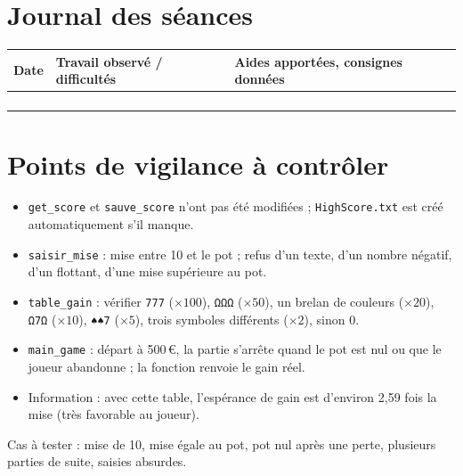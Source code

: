 \documentclass[10pt,a4paper]{article}
\begin{document}
\section*{Journal des séances}
\begin{tabularx}{\linewidth}{@{}C{2cm} X X@{}}
\toprule
{} Date & Travail observé / difficultés & Aides apportées, consignes données \\
\midrule
 & & \\[8mm]
\midrule
 & & \\[8mm]
\midrule
 & & \\[8mm]
\midrule
 & & \\[8mm]
\bottomrule
\end{tabularx}

\section*{Points de vigilance à contrôler}
\begin{itemize}
\item \texttt{get\_\allowbreak{}score} et \texttt{sauve\_\allowbreak{}score} n'ont pas été modifiées ; \texttt{HighScore.txt} est créé automatiquement s'il manque.
\item \texttt{saisir\_\allowbreak{}mise} : mise entre 10 et le pot ; refus d'un texte, d'un nombre négatif, d'un flottant, d'une mise supérieure au pot.
\item \texttt{table\_\allowbreak{}gain} : vérifier \texttt{777} ($\times 100$), \texttt{ΩΩΩ} ($\times 50$), un brelan de couleurs ($\times 20$), \texttt{Ω7Ω} ($\times 10$), \texttt{♠♠7} ($\times 5$), trois symboles différents ($\times 2$), sinon 0.
\item \texttt{main\_\allowbreak{}game} : départ à 500\,\euro, la partie s'arrête quand le pot est nul ou que le joueur abandonne ; la fonction renvoie le gain réel.
\item Information : avec cette table, l'espérance de gain est d'environ 2,59 fois la mise (très favorable au joueur).
\end{itemize}
\smallskip
Cas à tester : mise de 10, mise égale au pot, pot nul après une perte, plusieurs parties de suite, saisies absurdes.
\end{document}
